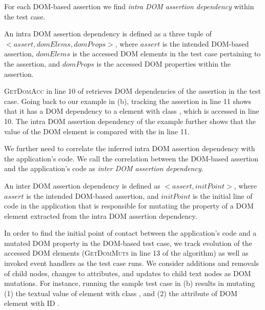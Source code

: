 For each DOM-based assertion we find \emph{intra DOM assertion dependency} within the test case.
\begin{mydef}
\label{def:intraDOMDep}  
An intra DOM assertion dependency is defined as a three tuple of $<assert, domElems, domProps>$, where $assert$ is the intended DOM-based assertion, $domElems$ is the accessed DOM elements in the test case pertaining to the assertion, and $domProps$ is the accessed DOM properties within the assertion.
\end{mydef}
\textsc{GetDomAcc} in line 10 of  retrieves DOM dependencies of the assertion in the test case.
Going back to our example in (b), tracking the assertion in line 11 shows that it has a DOM dependency to a  element with class , which is accessed in line 10. The intra DOM assertion dependency of the example further shows that the  value of the DOM element is compared with the  in line 11.    

We further need to correlate the inferred intra DOM assertion dependency with the application's code.
We call the correlation between the DOM-based assertion and the application's code as \emph{inter DOM assertion dependency}.
\begin{mydef}
\label{def:interDOMDep}  
An inter DOM assertion dependency is defined as
$<assert, initPoint>$, where $assert$ is the intended DOM-based assertion, and $initPoint$ is the initial line of code in the application that is responsible for mutating the property of a DOM element extracted from the intra DOM assertion dependency.
\end{mydef}
In order to find the initial point of contact between the application's code and a mutated DOM property in the DOM-based test case, we track evolution of the accessed DOM elements (\textsc{GetDomMuts} in line 13 of the algorithm) as well as invoked event handlers as the test case runs. 
We consider additions and removals of child nodes, changes to attributes, and updates to child text nodes as DOM mutations. For instance, running the sample test case in (b) results in mutating (1) the textual value of  element with class , and (2) the  attribute of DOM element with ID .

